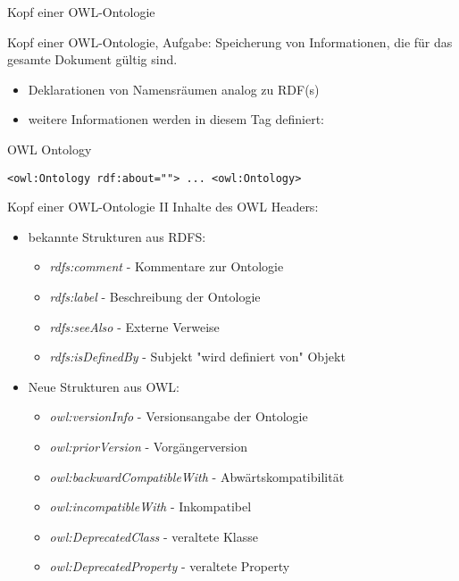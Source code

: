 \documentclass{beamer}
\begin{document}
\begin{frame}[fragile]{Kopf einer OWL-Ontologie}
\begin{block}{Kopf einer OWL-Ontologie, Aufgabe:}
Speicherung von Informationen, die für das gesamte Dokument gültig sind.
\end{block}
\begin{itemize}
	\item Deklarationen von Namensräumen analog zu RDF(s)
	\item weitere Informationen werden in diesem  Tag definiert: 
\end{itemize}
\begin{block}{OWL Ontology}
\begin{lstlisting}[lang="xml"]
<owl:Ontology rdf:about=""> ... <owl:Ontology>
\end{lstlisting}
\end{block}
\end{frame}

\begin{frame}{Kopf einer OWL-Ontologie II}
Inhalte des OWL Headers:
\begin{itemize}
	\item bekannte Strukturen aus RDFS:
	\begin{itemize}
		\item  \emph{rdfs:comment} - Kommentare zur Ontologie
		\item  \emph{rdfs:label} - Beschreibung der Ontologie
		\item  \emph{rdfs:seeAlso} - Externe Verweise
		\item  \emph{rdfs:isDefinedBy} - Subjekt "wird definiert von" Objekt
	\end{itemize}
\end{itemize}
\begin{itemize}
	\item Neue Strukturen aus OWL:
	\begin{itemize}
		\item \emph{owl:versionInfo} - Versionsangabe der Ontologie
		\item \emph{owl:priorVersion} - Vorgängerversion
		\item \emph{owl:backwardCompatibleWith} - Abwärtskompatibilität
		\item \emph{owl:incompatibleWith} - Inkompatibel
		\item \emph{owl:DeprecatedClass} - veraltete Klasse
		\item \emph{owl:DeprecatedProperty} - veraltete Property
	\end{itemize}
\end{itemize}
\end{frame}
\end{document}
